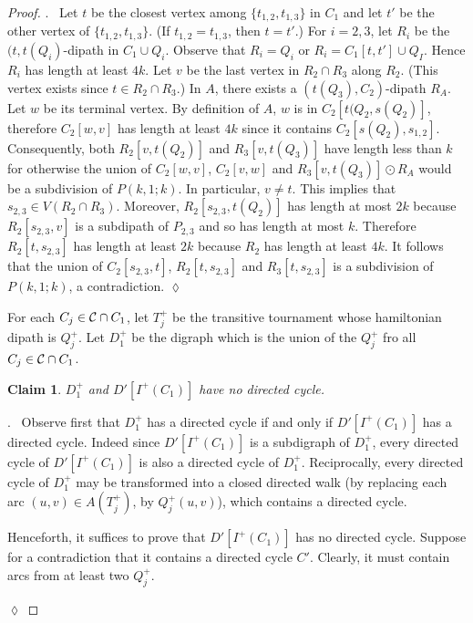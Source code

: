 \documentclass[utf8,10pt]{article}
\theoremstyle{plain}
\newtheorem{claim}{Claim}[theorem]
\theoremstyle{definition}
\theoremstyle{remark}
\newenvironment{subproof}{\par\noindent {\it Subproof}.\ }{\hfill$\lozenge$\par\vspace{11pt}}
\begin{document}
\begin{proof}
\begin{subproof}
Let $t$ be the closest vertex among $\{t_{1,2}, t_{1,3}\}$ in $C_1$ and let $t'$ be the other vertex of $\{t_{1,2}, t_{1,3}\}$.
(If $t_{1,2}=t_{1,3}$, then $t=t'$.) For $i=2,3$, let $R_i$ be the $(t,t(Q_i)$-dipath in $C_1\cup Q_i$. Observe that $R_i=Q_i$ or $R_i=C_1[t,t']\cup Q_I$. Hence $R_i$ has length at least $4k$.
Let $v$ be the last vertex in $R_2\cap R_3$ along $R_2$. (This vertex exists since $t\in R_2\cap R_3$.) In $A$, there exists a $(t(Q_3), C_2)$-dipath $R_A$. Let $w$ be its terminal vertex. By definition of $A$, $w$ is in $C_2[t(Q_2, s(Q_2)]$, therefore $C_2[w,v]$ has length at least $4k$ since it contains $C_2[s(Q_2), s_{1,2}]$. Consequently, both $R_2[v,t(Q_2)]$ and $R_3[v,t(Q_3)]$ have length less than $k$ for otherwise the union of $C_2[w,v]$, $C_2[v,w]$ and $R_3[v,t(Q_3)]\odot R_A$ would be a subdivision of $P(k,1;k)$.
In particular, $v\neq t$. This implies that $s_{2,3}\in V(R_2\cap R_3)$.
Moreover, $R_2[s_{2,3}, t(Q_2)]$ has length at most $2k$ because $R_2[s_{2,3},v]$ is a subdipath of $P_{2,3}$ and so has length at most $k$.
Therefore $R_2[t,s_{2,3}]$ has length at least $2k$ because $R_2$ has length at least $4k$.
It follows that the union of $C_2[s_{2,3},t]$,  $R_2[t,s_{2,3}]$ and  $R_3[t,s_{2,3}]$ is a subdivision of $P(k,1;k)$, a contradiction.
\end{subproof}



For each $C_j\in {\cal C}\cap C_1$, let $T^+_j$ be the transitive tournament whose hamiltonian dipath is $Q^+_j$.
Let $D^+_1$ be the digraph which is the union of the $Q^+_j$ fro all $C_j\in  {\cal C}\cap C_1$.

\begin{claim}\label{claim:no-dicycle}
$D^+_1$  and $D'[I^+(C_1)]$ have no directed cycle.  
\end{claim}
\begin{subproof}
Observe first that $D^+_1$ has a directed cycle if and only if $D'[I^+(C_1)]$ has a directed cycle.
Indeed since $D'[I^+(C_1)]$ is a subdigraph of $D^+_1$, every directed cycle of $D'[I^+(C_1)]$ is also a directed cycle of $D^+_1$.
Reciprocally, every directed cycle of $D^+_1$ may be transformed into a closed directed walk (by replacing each arc $(u,v)\in A(T^+_j)$, by 
$Q^+_j(u,v)$), which contains a directed cycle.

Henceforth, it suffices to prove that $D'[I^+(C_1)]$ has no directed cycle.  
Suppose for a contradiction that it contains a directed cycle $C'$.
Clearly, it must contain arcs from at least two $Q^+_j$.




\end{subproof}
\end{proof}
\end{document}
